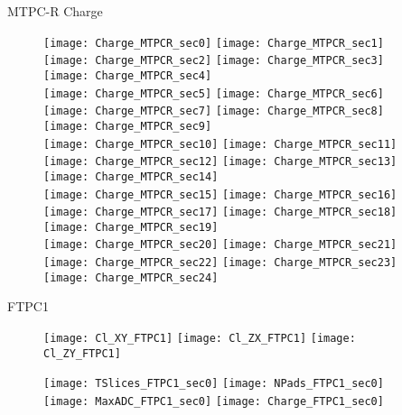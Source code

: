 \documentclass[11pt]{beamer}
\begin{document}
\begin{frame}{MTPC-R Charge}
\begin{figure}
\texttt{[image: Charge\_MTPCR\_sec0]}
\texttt{[image: Charge\_MTPCR\_sec1]}
\texttt{[image: Charge\_MTPCR\_sec2]}
\texttt{[image: Charge\_MTPCR\_sec3]}
\texttt{[image: Charge\_MTPCR\_sec4]}\\
\texttt{[image: Charge\_MTPCR\_sec5]}
\texttt{[image: Charge\_MTPCR\_sec6]}
\texttt{[image: Charge\_MTPCR\_sec7]}
\texttt{[image: Charge\_MTPCR\_sec8]}
\texttt{[image: Charge\_MTPCR\_sec9]}\\
\texttt{[image: Charge\_MTPCR\_sec10]}
\texttt{[image: Charge\_MTPCR\_sec11]}
\texttt{[image: Charge\_MTPCR\_sec12]}
\texttt{[image: Charge\_MTPCR\_sec13]}
\texttt{[image: Charge\_MTPCR\_sec14]}\\
\texttt{[image: Charge\_MTPCR\_sec15]}
\texttt{[image: Charge\_MTPCR\_sec16]}
\texttt{[image: Charge\_MTPCR\_sec17]}
\texttt{[image: Charge\_MTPCR\_sec18]}
\texttt{[image: Charge\_MTPCR\_sec19]}\\
\texttt{[image: Charge\_MTPCR\_sec20]}
\texttt{[image: Charge\_MTPCR\_sec21]}
\texttt{[image: Charge\_MTPCR\_sec22]}
\texttt{[image: Charge\_MTPCR\_sec23]}
\texttt{[image: Charge\_MTPCR\_sec24]}
\end{figure}
\end{frame}

\begin{frame}
\centering
\Huge
FTPC1
\end{frame}

\begin{frame}{}
\begin{figure}
\centering
\texttt{[image: Cl\_XY\_FTPC1]}
\texttt{[image: Cl\_ZX\_FTPC1]}
\texttt{[image: Cl\_ZY\_FTPC1]}
\end{figure}
\end{frame}

\begin{frame}{}
\begin{figure}
\centering
\texttt{[image: TSlices\_FTPC1\_sec0]}
\texttt{[image: NPads\_FTPC1\_sec0]}
\texttt{[image: MaxADC\_FTPC1\_sec0]}
\texttt{[image: Charge\_FTPC1\_sec0]} 
\end{figure}
\end{frame}
\end{document}
